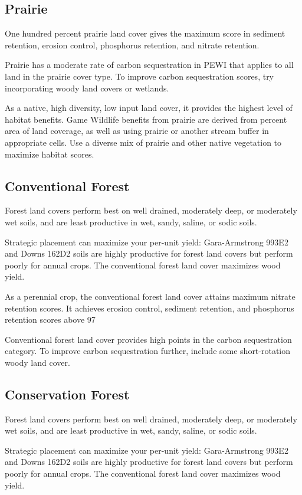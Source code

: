 \documentclass[11pt]{article}
\begin{document}
\subsection{Prairie}
One hundred percent prairie land cover gives the maximum score in sediment retention, erosion control, phosphorus retention, and nitrate retention.

Prairie has a moderate rate of carbon sequestration in PEWI that applies to all land in the prairie cover type. To improve carbon sequestration scores, try incorporating woody land covers or wetlands.

As a native, high diversity, low input land cover, it provides the highest level of habitat benefits. Game Wildlife benefits from prairie are derived from percent area of land coverage, as well as using prairie or another stream buffer in appropriate cells. Use a diverse mix of prairie and other native vegetation to maximize habitat scores.


\subsection{Conventional Forest}
Forest land covers perform best on well drained, moderately deep, or moderately wet soils, and are least productive in wet, sandy, saline, or sodic soils.

Strategic placement can maximize your per-unit yield: Gara-Armstrong 993E2 and Downs 162D2 soils are highly productive for forest land covers but perform poorly for annual crops. The conventional forest land cover maximizes wood yield.

As a perennial crop, the conventional forest land cover attains maximum nitrate retention scores. It achieves erosion control, sediment retention, and phosphorus retention scores above 97%

Conventional forest land cover provides high points in the carbon sequestration category. To improve carbon sequestration further, include some short-rotation woody land cover.

\subsection{Conservation Forest}
Forest land covers perform best on well drained, moderately deep, or moderately wet soils, and are least productive in wet, sandy, saline, or sodic soils.

Strategic placement can maximize your per-unit yield: Gara-Armstrong 993E2 and Downs 162D2 soils are highly productive for forest land covers but perform poorly for annual crops. The conventional forest land cover maximizes wood yield.
\end{document}
